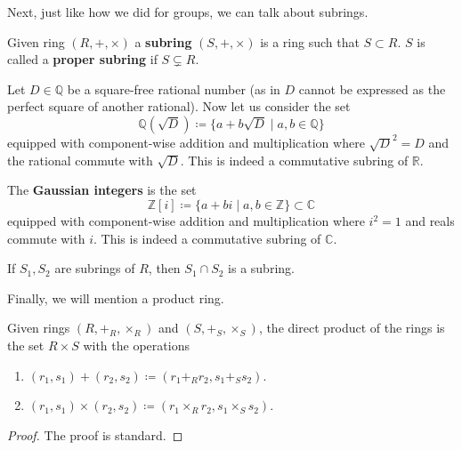   Next, just like how we did for groups, we can talk about subrings. 

  \begin{definition}[Subring]
    Given ring $(R, +, \times)$ a \textbf{subring} $(S, +, \times)$ is a ring such that $S \subset R$. $S$ is called a \textbf{proper subring} if $S \subsetneq R$. 
  \end{definition}

  \begin{example}
    Let $D \in \mathbb{Q}$ be a square-free rational number (as in $D$ cannot be expressed as the perfect square of another rational). Now let us consider the set 
    \begin{equation}
      \mathbb{Q} (\sqrt{D}) \coloneqq \{a + b \sqrt{D} \mid a, b \in \mathbb{Q} \}
    \end{equation}
    equipped with component-wise addition and multiplication where $\sqrt{D}^2 = D$ and the rational commute with $\sqrt{D}$. This is indeed a commutative subring of $\mathbb{R}$. 
  \end{example}

  \begin{example}
    The \textbf{Gaussian integers} is the set 
    \begin{equation}
      \mathbb{Z}[i] \coloneqq \{a + bi \mid a, b \in \mathbb{Z} \} \subset \mathbb{C}
    \end{equation}
    equipped with component-wise addition and multiplication where $i^2 = 1$ and reals commute with $i$. This is indeed a commutative subring of $\mathbb{C}$. 
  \end{example}

  \begin{theorem}
    If $S_1, S_2$ are subrings of $R$, then $S_1 \cap S_2$ is a subring. 
  \end{theorem}

  Finally, we will mention a product ring. 

  \begin{definition}
    Given rings $(R, +_R, \times_R)$ and $(S, +_S, \times_S)$, the direct product of the rings is the set $R \times S$ with the operations 
    \begin{enumerate}
      \item $(r_1, s_1) + (r_2, s_2) \coloneqq (r_1 +_R r_2, s_1 +_S s_2)$. 
      \item $(r_1, s_1) \times (r_2, s_2) \coloneqq (r_1 \times_R r_2, s_1 \times_S s_2)$. 
    \end{enumerate}
  \end{definition}
  \begin{proof}
    The proof is standard. 
  \end{proof}

